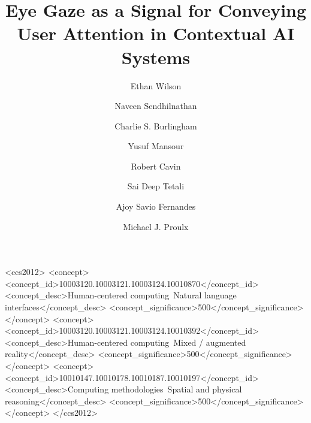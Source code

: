 \documentclass[sigconf,nonacm,authorversion]{acmart}
\begin{document}
\title{Eye Gaze as a Signal for Conveying User Attention in Contextual AI Systems}

\author{Ethan Wilson}

\author{Naveen Sendhilnathan}

\author{Charlie S. Burlingham}

\author{Yusuf Mansour}

\author{Robert Cavin}

\author{Sai Deep Tetali}

\author{Ajoy Savio Fernandes}

\author{Michael J. Proulx}


\renewcommand{\shortauthors}{Wilson et al.}



\begin{CCSXML}
<ccs2012>
   <concept>
       <concept_id>10003120.10003121.10003124.10010870</concept_id>
       <concept_desc>Human-centered computing~Natural language interfaces</concept_desc>
       <concept_significance>500</concept_significance>
       </concept>
   <concept>
       <concept_id>10003120.10003121.10003124.10010392</concept_id>
       <concept_desc>Human-centered computing~Mixed / augmented reality</concept_desc>
       <concept_significance>500</concept_significance>
       </concept>
   <concept>
       <concept_id>10010147.10010178.10010187.10010197</concept_id>
       <concept_desc>Computing methodologies~Spatial and physical reasoning</concept_desc>
       <concept_significance>500</concept_significance>
       </concept>
 </ccs2012>
\end{CCSXML}
\end{document}
